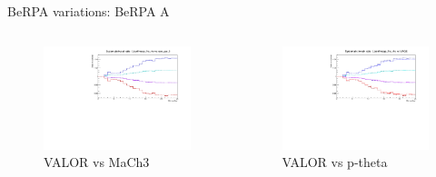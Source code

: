 \documentclass{beamer}
\begin{document}
\begin{frame}{BeRPA variations: BeRPA A}
	\centering
	\begin{columns}
		\begin{column}{0.5\paperwidth}
			\begin{figure}
				\includegraphics[page=7, trim={0cm 0cm 0cm 0cm}, clip, scale=0.35] {images/variations/valor_mach3/variations_prebanff_unosc_1Re}
				\caption*{VALOR vs MaCh3}
			\end{figure}
		\end{column}
		\begin{column}{0.5\paperwidth}
			\begin{figure}
				\includegraphics[page=17, trim={0cm 0cm 0cm 0cm}, clip, scale=0.35] {images/variations/valor_ptheta/variations_prebanff_unosc_1Re}
				\caption*{VALOR vs p-theta}
			\end{figure}
		\end{column}
	\end{columns}
\end{frame}
\end{document}

